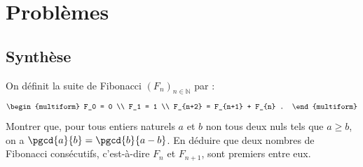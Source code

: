 \chapter{Problèmes}
\section{Synthèse}
\begin{exo}
\label{exo:pb fibonacci}
	On d\'efinit la suite de Fibonacci $(F_n)_{n\in\mathbb{N}}$ par :
	\[
		\begin{multiform}
			F_0 = 0 \\
			F_1 = 1 \\
			F_{n+2} = F_{n+1} + F_{n} .
		\end{multiform}
	\]
	Montrer que, pour tous entiers naturels $a$ et $b$ non tous deux nuls tels que $a \geq b$, on a
	$\pgcd{a}{b} = \pgcd{b}{a-b}$.
	En d\'eduire que deux nombres de Fibonacci cons\'ecutifs, c'est-\`a-dire
	$F_n$ et $F_{n+1}$, sont premiers entre eux.
\end{exo}

